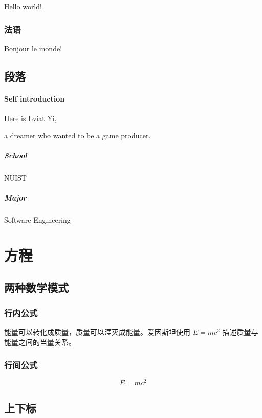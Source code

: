 \documentclass[UTF8]{ctexart}
\begin{document}
Hello world!

\subsubsection{法语}

Bonjour le monde!

\subsection{段落}

\paragraph{Self introduction}

Here is Lviat Yi,

a dreamer who wanted to be a game producer.

\subparagraph{School}

NUIST

\subparagraph{Major}

Software Engineering

\section{方程}

\subsection{两种数学模式}

\subsubsection{行内公式}
能量可以转化成质量，质量可以湮灭成能量。爱因斯坦使用 $E=mc^2$ 描述质量与能量之间的当量关系。

\subsubsection{行间公式}
\[E=mc^2\]

\subsection{上下标}

\end{document}

